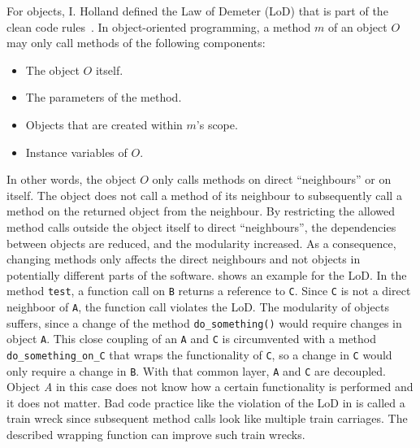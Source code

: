 For objects, I. Holland defined the Law of Demeter (LoD) that is part of the clean code rules~\cite{lieberherr_assuring_1989}.
In object-oriented programming, a method $m$ of an object $O$ may only call methods of the following components:
\begin{itemize}
    \item The object $O$ itself.
    \item The parameters of the method.
    \item Objects that are created within $m$'s scope.
    \item Instance variables of $O$.
\end{itemize}
In other words, the object $O$ only calls methods on direct \enquote{neighbours} or on itself. The object does not call a method of its neighbour to subsequently call a method on the returned object from the neighbour. By restricting the allowed method calls outside the object itself to direct \enquote{neighbours}, the dependencies between objects are reduced, and the modularity increased. As a consequence, changing methods only affects the direct neighbours and not objects in potentially different parts of the software. 
 shows an example for the LoD. In the method \texttt{test}, a function call on \texttt{B} returns a reference to \texttt{C}. Since \texttt{C} is not a direct neighboor of \texttt{A}, the function call violates the LoD. The modularity of objects suffers, since a change of the method \texttt{do\_something()} would require changes in object \texttt{A}. This close coupling of an \texttt{A} and \texttt{C} is circumvented with a method \texttt{do\_something\_on\_C} that wraps the functionality of \texttt{C}, so a change in \texttt{C} would only require a change in \texttt{B}. With that common layer, \texttt{A} and \texttt{C} are decoupled. Object \textit{A} in this case does not know how a certain functionality is performed and it does not matter.  
Bad code practice like the violation of the LoD in  is called a train wreck since subsequent method calls look like multiple train carriages. The described wrapping function can improve such train wrecks.

